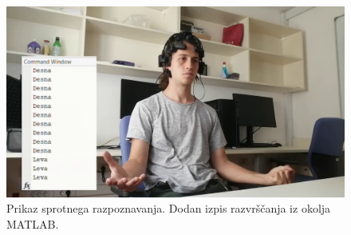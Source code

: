 \begin{figure}
    \begin{center}
    \includegraphics[width=1\linewidth]{slike/razpoznavanje.png}
    \end{center}
    \caption[Prikaz sprotnega razpoznavanja]{Prikaz sprotnega razpoznavanja. Dodan izpis razvrščanja iz okolja MATLAB.}
    \end{figure}



